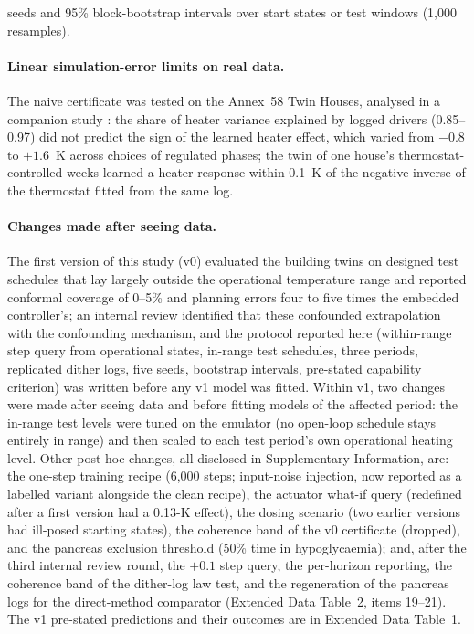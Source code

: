 \documentclass[11pt]{article}
\begin{document}
seeds and 95\% block-bootstrap intervals over start states or test windows (1,000 resamples).

\paragraph{Linear simulation-error limits on real data.} The naive certificate was tested on the Annex~58 Twin Houses, analysed in a companion study \citep{biswas2026hierarchy}: the share of heater variance explained by logged drivers (0.85--0.97) did not predict the sign of the learned heater effect, which varied from $-0.8$ to $+1.6$~K across choices of regulated phases; the twin of one house's thermostat-controlled weeks learned a heater response within 0.1~K of the negative inverse of the thermostat fitted from the same log.

\paragraph{Changes made after seeing data.} The first version of this study (v0) evaluated the building twins on designed test schedules that lay largely outside the operational temperature range and reported conformal coverage of 0--5\% and planning errors four to five times the embedded controller's; an internal review identified that these confounded extrapolation with the confounding mechanism, and the protocol reported here (within-range step query from operational states, in-range test schedules, three periods, replicated dither logs, five seeds, bootstrap intervals, pre-stated capability criterion) was written before any v1 model was fitted. Within v1, two changes were made after seeing data and before fitting models of the affected period: the in-range test levels were tuned on the emulator (no open-loop schedule stays entirely in range) and then scaled to each test period's own operational heating level. Other post-hoc changes, all disclosed in Supplementary Information, are: the one-step training recipe (6,000 steps; input-noise injection, now reported as a labelled variant alongside the clean recipe), the actuator what-if query (redefined after a first version had a 0.13-K effect), the dosing scenario (two earlier versions had ill-posed starting states), the coherence band of the v0 certificate (dropped), and the pancreas exclusion threshold (50\% time in hypoglycaemia); and, after the third internal review round, the $+0.1$ step query, the per-horizon reporting, the coherence band of the dither-log law test, and the regeneration of the pancreas logs for the direct-method comparator (Extended Data Table~2, items 19--21). The v1 pre-stated predictions and their outcomes are in Extended Data Table~1.
\end{document}
